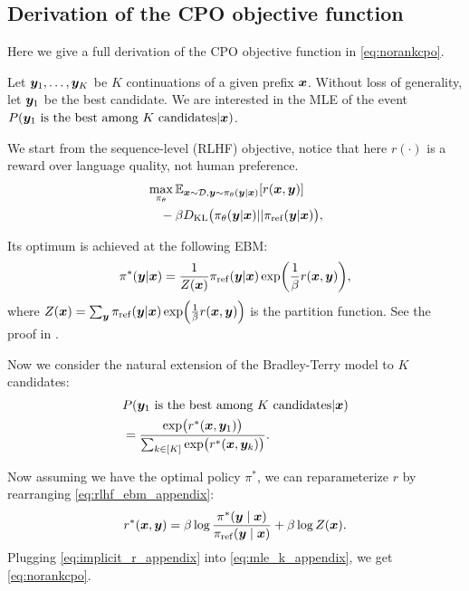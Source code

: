 \subsection{Derivation of the CPO objective function}
Here we give a full derivation of the CPO objective function in \cref{eq:norankcpo}.

Let ${\bm{y}}_1,\ldots,{\bm{y}}_K$ be $K$ continuations of a given prefix ${\bm{x}}$. Without loss of generality, let ${\bm{y}}_1$ be the best candidate. We are interested in the MLE of the event $P({\bm{y}}_1 \text{ is the best among $K$ candidates}|{\bm{x}})$.

We start from the sequence-level (RLHF) objective, notice that here $r(\cdot)$ is a reward over language quality, not human preference.
\begin{align}
\begin{split}
		& \max_{\pi_\theta} \E_{\vx\sim\gD, \vy\sim\pi_\theta(\vy|\vx)}[r(\vx, \vy)] \\
		& \quad-\beta \KL\p{\pi_\theta(\vy|\vx)||\pr(\vy|\vx)},
\end{split}
\end{align}

Its optimum is achieved at the following EBM:
\begin{align}\label{eq:rlhf_ebm_appendix}
	\pi^*(\vy|\vx) = \frac{1}{Z(\vx)}\pr(\vy|\vx)\exp\p{\frac{1}{\beta}r(\vx,\vy)},
\end{align}
where $Z(\vx)=\sum_{\vy}\pr(\vy|\vx)\exp\p{\frac{1}{\beta}r(\vx,\vy)}$ is the partition function. See the proof in \cite{rafailov2023direct,korbak2022rl}.



Now we consider the natural extension of the Bradley-Terry model to $K$ candidates:
\begin{align}\label{eq:mle_k_appendix}
\begin{split}
	&P(\vy_1 \text{ is the best among $K$ candidates}|\vx)\\
	&=\frac{\exp\p{r^*(\vx, \vy_1)}}{\sum_{k\in[K]}\exp\p{r^*(\vx, \vy_k)}}.
\end{split}
\end{align}

Now assuming we have the optimal policy $\pi^*$, we can reparameterize $r$ by rearranging \cref{eq:rlhf_ebm_appendix}:
\begin{align}\label{eq:implicit_r_appendix}
\begin{split}
	r^*({\bm{x}}, {\bm{y}})=\beta \log \frac{\pi^*({\bm{y}} \mid {\bm{x}})}{\pi_{\mathrm{ref}}({\bm{y}} \mid {\bm{x}})}+\beta \log Z({\bm{x}}).
\end{split}
\end{align}
Plugging \cref{eq:implicit_r_appendix} into \cref{eq:mle_k_appendix}, we get \cref{eq:norankcpo}.

